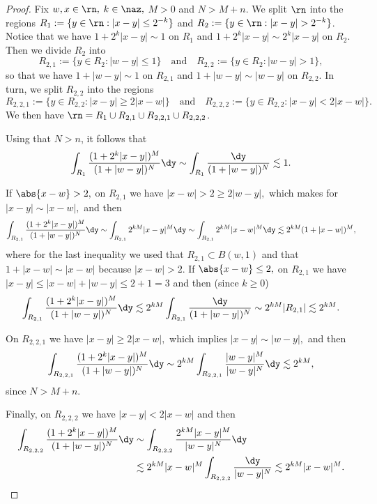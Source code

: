 \begin{proof} Fix $w,x\in\rn,$  $k\in\naz,$ $M>0$ and $N>M+n.$ We split $\rn$ into the regions $R_1:=\{y \in \rn: |x-y| \leq 2^{-k} \}$ and $R_2:=\{y \in \rn: |x-y| > 2^{-k} \}$. Notice that we have $1 + 2^k |x-y| \sim 1$ on $R_1$   and $1 + 2^k |x-y| \sim 2^k |x-y|$ on $R_2$. Then we divide  $R_2$ into 
$$
R_{2,1}:= \{y \in R_2: |w-y| \leq 1 \}\quad \text{and} \quad R_{2,2}:= \{y \in R_2: |w-y| > 1 \},
$$
so that we have $1+ |w-y| \sim 1$ on $R_{2,1}$ and $1+ |w-y| \sim |w-y|$ on $R_{2,2}$. In turn,  we split $R_{2,2}$ into the regions
$$
R_{2,2,1}:= \{y \in R_{2,2}: |x-y| \geq 2 |x-w| \}\quad \text{and} \quad R_{2,2,2}:= \{y \in R_{2,2}: |x-y| < 2 |x-w| \}.
$$
We then have $\rn = R_1\cup  R_{2,1} \cup R_{2,2,1} \cup R_{2,2,2}$. 

Using that $N > n$, it follows that
$$
\int_{R_1} \frac{(1+ 2^k |x-y|)^M}{(1+ |w - y|)^N} \dy \sim \int_{R_1} \frac{\dy}{(1+ |w - y|)^N} \lesssim 1. 
$$

If $\abs{x-w}>2,$ on $R_{2,1}$ we have $|x-w| > 2 \geq 2 |w-y|,$ which makes for $|x-y| \sim |x - w|,$ and then
$$
\int_{R_{2,1}} \frac{(1+ 2^k |x-y|)^M}{(1+ |w - y|)^N} \dy \sim \int_{R_{2,1}} 2^{kM} |x-y|^M \dy \sim \int_{R_{2,1}} 2^{kM} |x-w|^M \dy   \lesssim  2^{kM} (1 + |x-w|)^M,
$$
where for the last inequality we used that $R_{2,1} \subset B(w, 1)$ and that $1 + |x-w| \sim |x-w|$ because $|x-w| > 2$. 
If $\abs{x-w}\le 2,$ on $R_{2,1}$ we have $|x -y| \leq |x-w| + |w - y| \leq 2 + 1 = 3$ and then (since $k \geq 0$)
$$
\int_{R_{2,1}} \frac{(1+ 2^k |x-y|)^M}{(1+ |w - y|)^N} \dy \lesssim 2^{kM} \int_{R_{2,1}} \frac{\dy}{(1+ |w - y|)^N} \sim 2^{kM} |R_{2,1}| \lesssim  2^{kM}.
$$

On $R_{2,2,1}$ we have $|x-y| \geq 2 |x-w|,$ which implies $|x-y| \sim |w-y|,$ and then
$$
\int_{R_{2,2,1}} \frac{(1+ 2^k |x-y|)^M}{(1+ |w - y|)^N} \dy \sim 2^{kM} \int_{R_{2,2,1}} \frac{|w-y|^M}{|w - y|^N} \dy  \lesssim 2^{kM},
$$
since $N  >M+  n$. 

Finally, on  $R_{2,2,2}$ we have $|x-y| < 2 |x-w|$ and then
\begin{align*}
\int_{R_{2,2,2}} \frac{(1+ 2^k |x-y|)^M}{(1+ |w - y|)^N} \dy &\sim \int_{R_{2,2,2}} \frac{2^{kM} |x-y|^M}{|w - y|^N} \dy \\&\lesssim  2^{kM} |x-w|^M  \int_{R_{2,2,2}}  \frac{\dy}{|w - y|^N}  \lesssim  2^{kM} |x-w|^M.
\end{align*}
\end{proof}


